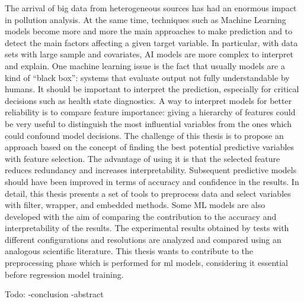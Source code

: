 The arrival of big data from heterogeneous sources has had an enormous impact in pollution analysis.
At the same time, techniques such as Machine Learning models become more and more the main approaches to make prediction and to detect the main factors affecting a given target variable.
In particular, with data sets with large sample and covariates, AI models are more complex to interpret and explain.
One machine learning issue is the fact that usually models are a kind of “black box”: systems that evaluate output not fully understandable by humans. 
It should be important to interpret the prediction, especially for critical decisions such as health state diagnostics.
A way to interpret models for better reliability is to compare feature importance: giving a hierarchy of features could be very useful to distinguish the most influential variables from the ones which could confound model decisions.
The challenge of this thesis is to propose an approach based on the concept of finding the best potential predictive variables with feature selection.
The advantage of using it is that the selected feature reduces redundancy and increases interpretability. 
Subsequent predictive models should have been improved in terms of accuracy and confidence in the results.
In detail, this thesis presents a set of tools to preprocess data and select variables with filter, wrapper, and embedded methods.
Some ML models are also developed with the aim of comparing the contribution to the accuracy and interpretability of the results.
The experimental results obtained by tests with different configurations and resolutions are analyzed and compared using an analogous scientific literature.
This thesis wants to contribute to the preprocessing phase which is performed for \gls{ml} models, considering it essential before regression model training.

Todo:
-conclusion 
-abstract
